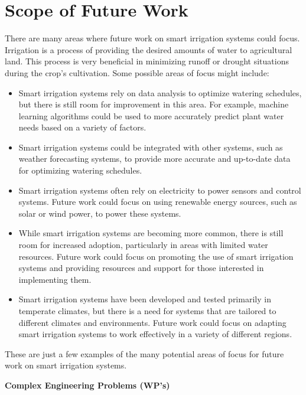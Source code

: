 \documentclass{report}
\begin{document}
\section{Scope of Future Work}
There are many areas where future work on smart irrigation systems could focus. Irrigation is a process of providing the desired amounts of water to agricultural land. This process is very beneficial in minimizing runoff or drought situations during the crop’s cultivation. Some possible areas of focus might include:\\ \cite{FutureSc95:online}
\begin{itemize}
    \item Smart irrigation systems rely on data analysis to optimize watering schedules, but there is still room for improvement in this area. For example, machine learning algorithms could be used to more accurately predict plant water needs based on a variety of factors.
    \item Smart irrigation systems could be integrated with other systems, such as weather forecasting systems, to provide more accurate and up-to-date data for optimizing watering schedules.
    \item Smart irrigation systems often rely on electricity to power sensors and control systems. Future work could focus on using renewable energy sources, such as solar or wind power, to power these systems.
    \item While smart irrigation systems are becoming more common, there is still room for increased adoption, particularly in areas with limited water resources. Future work could focus on promoting the use of smart irrigation systems and providing resources and support for those interested in implementing them.
    \item Smart irrigation systems have been developed and tested primarily in temperate climates, but there is a need for systems that are tailored to different climates and environments. Future work could focus on adapting smart irrigation systems to work effectively in a variety of different regions.
\end{itemize}
These are just a few examples of the many potential areas of focus for future work on smart irrigation systems. \\
\vspace{3cm}
\begin{center}
  \Large  {\bfseries Complex Engineering Problems (WP’s)}\\
  \end{center}
\end{document}

